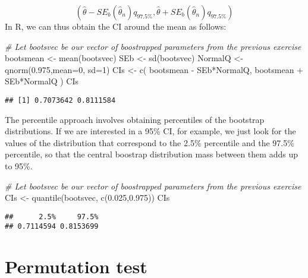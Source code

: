 \documentclass[
]{book}
\newenvironment{Shaded}{\begin{snugshade}}{\end{snugshade}}
\newcommand{\AttributeTok}[1]{\textcolor[rgb]{0.77,0.63,0.00}{#1}}
\newcommand{\CommentTok}[1]{\textcolor[rgb]{0.56,0.35,0.01}{\textit{#1}}}
\newcommand{\DecValTok}[1]{\textcolor[rgb]{0.00,0.00,0.81}{#1}}
\newcommand{\FloatTok}[1]{\textcolor[rgb]{0.00,0.00,0.81}{#1}}
\newcommand{\FunctionTok}[1]{\textcolor[rgb]{0.00,0.00,0.00}{#1}}
\newcommand{\NormalTok}[1]{#1}
\newcommand{\OtherTok}[1]{\textcolor[rgb]{0.56,0.35,0.01}{#1}}
\newcommand{\SpecialCharTok}[1]{\textcolor[rgb]{0.00,0.00,0.00}{#1}}
\begin{document}
\[(\hat{\theta} - SE_b(\hat{\theta}_n)q_{97.5\%}, \hat{\theta} + SE_b(\hat{\theta}_n)q_{97.5\%})\]
In R, we can thus obtain the CI around the mean as follows:

\begin{Shaded}
\begin{Highlighting}[]
\CommentTok{\# Let bootsvec be our vector of boostrapped parameters from the previous exercise}
\NormalTok{bootsmean }\OtherTok{\textless{}{-}} \FunctionTok{mean}\NormalTok{(bootsvec)}
\NormalTok{SEb }\OtherTok{\textless{}{-}} \FunctionTok{sd}\NormalTok{(bootsvec)}
\NormalTok{NormalQ }\OtherTok{\textless{}{-}} \FunctionTok{qnorm}\NormalTok{(}\FloatTok{0.975}\NormalTok{,}\AttributeTok{mean=}\DecValTok{0}\NormalTok{, }\AttributeTok{sd=}\DecValTok{1}\NormalTok{)}
\NormalTok{CIs }\OtherTok{\textless{}{-}} \FunctionTok{c}\NormalTok{( bootsmean }\SpecialCharTok{{-}}\NormalTok{ SEb}\SpecialCharTok{*}\NormalTok{NormalQ, bootsmean }\SpecialCharTok{+}\NormalTok{ SEb}\SpecialCharTok{*}\NormalTok{NormalQ )}
\NormalTok{CIs}
\end{Highlighting}
\end{Shaded}

\begin{verbatim}
## [1] 0.7073642 0.8111584
\end{verbatim}

The percentile approach involves obtaining percentiles of the bootstrap distributions. If we are interested in a 95\% CI, for example, we just look for the values of the distribution that correspond to the 2.5\% percentile and the 97.5\% percentile, so that the central boostrap distribution mass between them adds up to 95\%.

\begin{Shaded}
\begin{Highlighting}[]
\CommentTok{\# Let bootsvec be our vector of boostrapped parameters from the previous exercise}
\NormalTok{CIs }\OtherTok{\textless{}{-}} \FunctionTok{quantile}\NormalTok{(bootsvec, }\FunctionTok{c}\NormalTok{(}\FloatTok{0.025}\NormalTok{,}\FloatTok{0.975}\NormalTok{))}
\NormalTok{CIs}
\end{Highlighting}
\end{Shaded}

\begin{verbatim}
##      2.5%     97.5% 
## 0.7114594 0.8153699
\end{verbatim}

\hypertarget{permutation-test}{%
\section{Permutation test}\label{permutation-test}}
\end{document}
